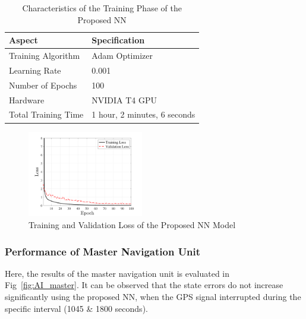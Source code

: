 \documentclass[3p]{elsarticle}
\begin{document}
\normalsize
\begin{table}[H]
	\centering
	\caption{
		Characteristics of the Training Phase of the Proposed NN
	}
	\begin{tabular}{l|l}
		\hline
		\textbf{Aspect} & \textbf{Specification} \\
		\hline
		Training Algorithm & Adam Optimizer \\
		Learning Rate & 0.001 \\
		Number of Epochs & 100 \\
		Hardware & NVIDIA T4 GPU \\
		Total Training Time & 1 hour, 2 minutes, 6 seconds \\
		\hline
	\end{tabular}\label{tab:training}
\end{table}



\begin{figure}[H]
	\centering
	\includegraphics[width=0.45\textwidth]{../Figure/loss}
	\caption{Training and Validation Loss of the Proposed NN Model}\label{fig:loss}
\end{figure}


\subsubsection{Performance of Master Navigation Unit}
\noindent Here, the results of the master navigation unit is evaluated in Fig~\ref{fig:AI_master}. It can be observed that the state errors do not increase significantly using the proposed NN,
when the GPS signal interrupted during the specific interval (1045 \& 1800 seconds).
\end{document}
